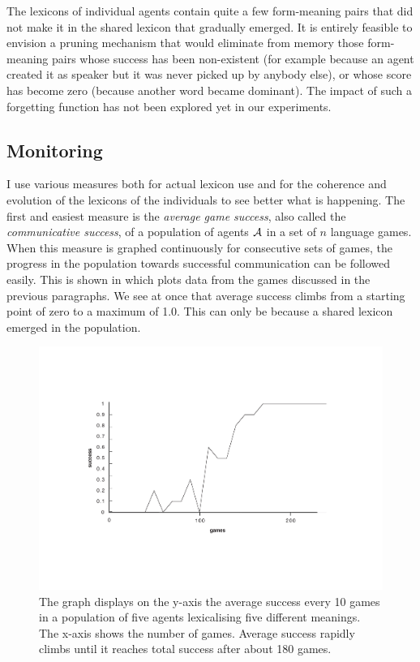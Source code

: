 The lexicons of individual agents contain quite a few form-meaning
pairs that did not make it in the shared lexicon that gradually 
emerged. It is entirely feasible to envision a pruning mechanism 
that would eliminate from memory those form-meaning pairs whose 
success has been non-existent (for example because an agent created
it as speaker but it was never picked up by anybody else), 
or whose score has become zero (because another word became
dominant). The impact of such a forgetting
function has not been explored yet in our experiments. 

\subsection{Monitoring} 

I use various measures both for actual lexicon use and for 
the coherence and evolution of the lexicons of
the individuals to see better what is happening. 
The first and easiest measure is the {\itshape average game success}, 
also called the {\itshape communicative success}, 
of a population of agents ${\cal A}$ in a set of $n$ language games. 
When this measure is graphed continuously for consecutive sets of 
games, the progress in the population
towards successful communication can be followed easily. This
is shown in  which plots data from the 
games discussed in the previous paragraphs. We see at once that
average success climbs from a starting point of zero
to a maximum of 1.0. This can only be because a shared lexicon 
emerged in the population. 

\begin{figure}[htbp]
  \centerline{\includegraphics[width=\textwidth]{chap5/figs/success.pdf}}
\caption{\label{success}The graph displays on the y-axis the average success every 10 games
in a population of five agents lexicalising five
different meanings. The x-axis 
shows the number of games. Average success
rapidly climbs until it reaches total success after 
about 180 games.}
\end{figure}

